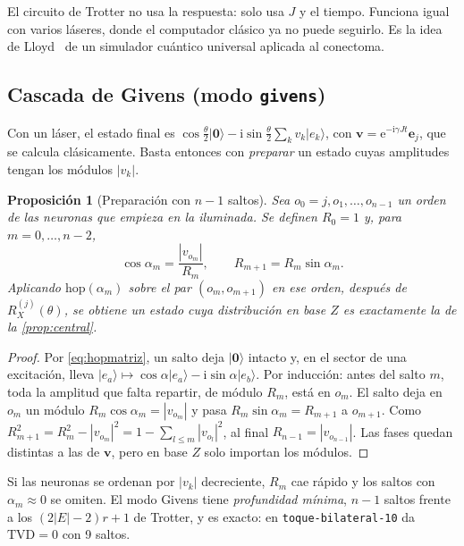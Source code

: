 \documentclass[11pt,a4paper]{article}
\renewcommand{\ket}[1]{\lvert #1\rangle}
\newcommand{\vac}{\ket{\mathbf{0}}}
\newcommand{\e}{\mathrm{e}}
\newcommand{\ii}{\mathrm{i}}
\newcommand{\hop}{\mathrm{hop}}
\newcommand{\TVD}{\mathrm{TVD}}
\newcommand{\RX}{R_X}
\newcommand{\code}[1]{\texttt{#1}}
\theoremstyle{plain}
\newtheorem{proposicion}{Proposición}[section]
\theoremstyle{definition}
\theoremstyle{remark}
\begin{document}
\begin{idea}
El circuito de Trotter no usa la respuesta: solo usa $J$ y el tiempo. Funciona igual con varios láseres, donde el computador clásico ya no puede seguirlo. Es la idea de Lloyd~\cite{lloyd1996} de un simulador cuántico universal aplicada al conectoma.
\end{idea}

\subsection{Cascada de Givens (modo \code{givens})}
\label{subsec:givens}

Con un láser, el estado final es $\cos\frac\theta2\vac-\ii\sin\frac\theta2\sum_kv_k\ket{e_k}$, con $\bm v=\e^{-\ii\gamma Jt}\bm e_j$, que se calcula clásicamente. Basta entonces con \emph{preparar} un estado cuyas amplitudes tengan los módulos $|v_k|$.

\begin{proposicion}[Preparación con $n-1$ saltos]\label{prop:givens}
Sea $o_0=j,o_1,\dots,o_{n-1}$ un orden de las neuronas que empieza en la iluminada. Se definen $R_0=1$ y, para $m=0,\dots,n-2$,
\begin{equation}
\cos\alpha_m=\frac{|v_{o_m}|}{R_m},\qquad R_{m+1}=R_m\sin\alpha_m .
\end{equation}
Aplicando $\hop(\alpha_m)$ sobre el par $(o_m,o_{m+1})$ en ese orden, después de $\RX^{(j)}(\theta)$, se obtiene un estado cuya distribución en base $Z$ es exactamente la de la \cref{prop:central}.
\end{proposicion}

\begin{proof}
Por \eqref{eq:hopmatriz}, un salto deja $\vac$ intacto y, en el sector de una excitación, lleva $\ket{e_a}\mapsto\cos\alpha\ket{e_a}-\ii\sin\alpha\ket{e_b}$. Por inducción: antes del salto $m$, toda la amplitud que falta repartir, de módulo $R_m$, está en $o_m$. El salto deja en $o_m$ un módulo $R_m\cos\alpha_m=|v_{o_m}|$ y pasa $R_m\sin\alpha_m=R_{m+1}$ a $o_{m+1}$. Como $R_{m+1}^2=R_m^2-|v_{o_m}|^2=1-\sum_{l\le m}|v_{o_l}|^2$, al final $R_{n-1}=|v_{o_{n-1}}|$. Las fases quedan distintas a las de $\bm v$, pero en base $Z$ solo importan los módulos.
\end{proof}

Si las neuronas se ordenan por $|v_k|$ decreciente, $R_m$ cae rápido y los saltos con $\alpha_m\approx0$ se omiten. El modo Givens tiene \emph{profundidad mínima}, $n-1$ saltos frente a los $(2|E|-2)r+1$ de Trotter, y es exacto: en \code{toque-bilateral-10} da $\TVD=0$ con 9 saltos.
\end{document}
